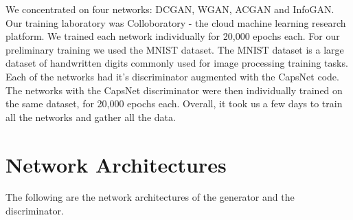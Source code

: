 We concentrated on four networks: DCGAN, WGAN, ACGAN and InfoGAN. Our training laboratory was Colloboratory - the cloud machine learning research platform. We trained each network individually for 20,000 epochs each. For our preliminary training we used the MNIST dataset. The MNIST dataset is a large dataset of handwritten digits commonly used for image processing training tasks. Each of the networks had it's discriminator augmented with the CapsNet code. The networks with the CapsNet discriminator were then individually trained on the same dataset, for 20,000 epochs each. Overall, it took us a few days to train all the networks and gather all the data.
\par\bigskip

\section{Network Architectures} %
\label{sec:network_architectures}
The following are the network architectures of the generator and the discriminator.

